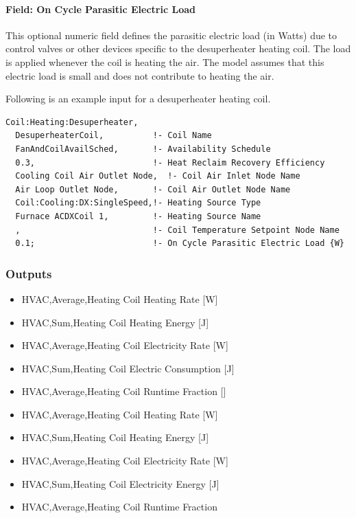 \paragraph{Field: On Cycle Parasitic Electric Load}\label{field-parasitic-electric-load}

This optional numeric field defines the parasitic electric load (in Watts) due to control valves or other devices specific to the desuperheater heating coil. The load is applied whenever the coil is heating the air. The model assumes that this electric load is small and does not contribute to heating the air.

Following is an example input for a desuperheater heating coil.

\begin{lstlisting}
Coil:Heating:Desuperheater,
  DesuperheaterCoil,          !- Coil Name
  FanAndCoilAvailSched,       !- Availability Schedule
  0.3,                        !- Heat Reclaim Recovery Efficiency
  Cooling Coil Air Outlet Node,  !- Coil Air Inlet Node Name
  Air Loop Outlet Node,       !- Coil Air Outlet Node Name
  Coil:Cooling:DX:SingleSpeed,!- Heating Source Type
  Furnace ACDXCoil 1,         !- Heating Source Name
  ,                           !- Coil Temperature Setpoint Node Name
  0.1;                        !- On Cycle Parasitic Electric Load {W}
\end{lstlisting}

\subsubsection{Outputs}\label{outputs-4-006}

\begin{itemize}
\item
  HVAC,Average,Heating Coil Heating Rate {[}W{]}
\item
  HVAC,Sum,Heating Coil Heating Energy {[}J{]}
\item
  HVAC,Average,Heating Coil Electricity Rate {[}W{]}
\item
  HVAC,Sum,Heating Coil Electric Consumption {[}J{]}
\item
  HVAC,Average,Heating Coil Runtime Fraction {[]}
\item
  HVAC,Average,Heating Coil Heating Rate {[}W{]}
\item
  HVAC,Sum,Heating Coil Heating Energy {[}J{]}
\item
  HVAC,Average,Heating Coil Electricity Rate {[}W{]}
\item
  HVAC,Sum,Heating Coil Electricity Energy {[}J{]}
\item
  HVAC,Average,Heating Coil Runtime Fraction
\end{itemize}

